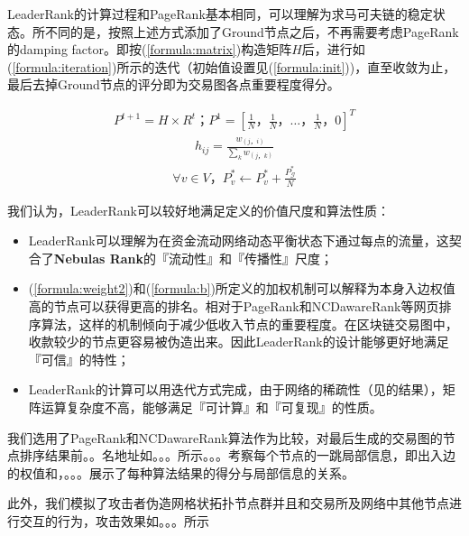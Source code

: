 LeaderRank的计算过程和PageRank基本相同，可以理解为求马可夫链的稳定状态。所不同的是，按照上述方式添加了Ground节点之后，不再需要考虑PageRank的damping factor\cite{Brin2010}\cite{page1999pagerank}。即按(\ref{formula:matrix})构造矩阵$H$后，进行如(\ref{formula:iteration})所示的迭代（初始值设置见(\ref{formula:init}))，直至收敛为止，最后去掉Ground节点的评分即为交易图各点重要程度得分。

\begin{align} \label{formula:iteration}
	P^{t+1} = H \times R^{t}； P^1=[\frac{1}{N}， \frac{1}{N}， \dots， \frac{1}{N}， 0]^T
\end{align}
\begin{align} \label{formula:matrix}
	h_{ij} = \frac{w_{(j，i)}}{\sum_k w_{(j，k)}}
\end{align}
\begin{align} \label{formula:init}
\forall v \in V， P^*_v \leftarrow P^*_v + \frac{P^*_{\mathcal{G}}}{N}
\end{align}


我们认为，LeaderRank可以较好地满足定义的价值尺度和算法性质：
\begin{itemize}
	\item LeaderRank可以理解为在资金流动网络动态平衡状态下通过每点的流量，这契合了\textbf{Nebulas Rank}的『流动性』和『传播性』尺度；
	\item (\ref{formula:weight2})和(\ref{formula:b})所定义的加权机制可以解释为本身入边权值高的节点可以获得更高的排名。相对于PageRank和NCDawareRank\cite{Nikolakopoulos2013}等网页排序算法，这样的机制倾向于减少低收入节点的重要程度。在区块链交易图中，收款较少的节点更容易被伪造出来。因此LeaderRank的设计能够更好地满足『可信』的特性；
	\item LeaderRank的计算可以用迭代方式完成，由于网络的稀疏性（见的结果），矩阵运算复杂度不高，能够满足『可计算』和『可复现』的性质。
\end{itemize}

我们选用了PageRank和NCDawareRank算法作为比较，对最后生成的交易图的节点排序结果前。。名地址如。。。所示。。。考察每个节点的一跳局部信息，即出入边的权值和，。。。展示了每种算法结果的得分与局部信息的关系。

此外，我们模拟了攻击者伪造网格状拓扑节点群并且和交易所及网络中其他节点进行交互的行为，攻击效果如。。。所示
